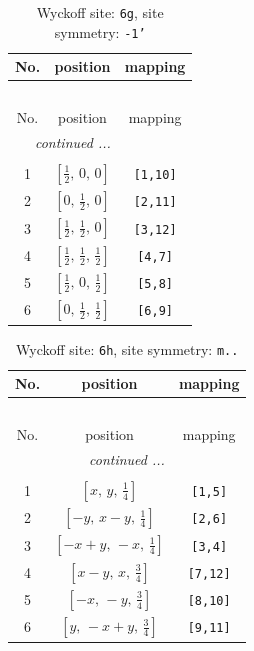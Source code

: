 \documentclass[fleqn,8pt]{jsarticle}
\begin{document}
\renewcommand{\arraystretch}{1.2}
\begin{longtable}{ccc}
\caption{Wyckoff site: {\tt 6g}, site symmetry: {\tt -1'}}
 \\
 \hline \hline
No. & position & mapping \\ \hline \endfirsthead

\multicolumn{2}{l}{\tablename\ \thetable{}} \\
 \hline \hline
No. & position & mapping \\ \hline \endhead

 \hline \hline
\multicolumn{2}{r}{\footnotesize\it continued ...} \\ \endfoot

 \hline \hline
\multicolumn{2}{r}{} \\ \endlastfoot

1 & $\left[ \frac{1}{2},\, 0,\, 0 \right]$ & {\tt [1,10]} \\ \hline
2 & $\left[ 0,\, \frac{1}{2},\, 0 \right]$ & {\tt [2,11]} \\ \hline
3 & $\left[ \frac{1}{2},\, \frac{1}{2},\, 0 \right]$ & {\tt [3,12]} \\ \hline
4 & $\left[ \frac{1}{2},\, \frac{1}{2},\, \frac{1}{2} \right]$ & {\tt [4,7]} \\ \hline
5 & $\left[ \frac{1}{2},\, 0,\, \frac{1}{2} \right]$ & {\tt [5,8]} \\ \hline
6 & $\left[ 0,\, \frac{1}{2},\, \frac{1}{2} \right]$ & {\tt [6,9]} \\
\end{longtable}
\renewcommand{\arraystretch}{1.2}
\begin{longtable}{ccc}
\caption{Wyckoff site: {\tt 6h}, site symmetry: {\tt m..}}
 \\
 \hline \hline
No. & position & mapping \\ \hline \endfirsthead

\multicolumn{2}{l}{\tablename\ \thetable{}} \\
 \hline \hline
No. & position & mapping \\ \hline \endhead

 \hline \hline
\multicolumn{2}{r}{\footnotesize\it continued ...} \\ \endfoot

 \hline \hline
\multicolumn{2}{r}{} \\ \endlastfoot

1 & $\left[ x,\, y,\, \frac{1}{4} \right]$ & {\tt [1,5]} \\ \hline
2 & $\left[ - y,\, x - y,\, \frac{1}{4} \right]$ & {\tt [2,6]} \\ \hline
3 & $\left[ - x + y,\, - x,\, \frac{1}{4} \right]$ & {\tt [3,4]} \\ \hline
4 & $\left[ x - y,\, x,\, \frac{3}{4} \right]$ & {\tt [7,12]} \\ \hline
5 & $\left[ - x,\, - y,\, \frac{3}{4} \right]$ & {\tt [8,10]} \\ \hline
6 & $\left[ y,\, - x + y,\, \frac{3}{4} \right]$ & {\tt [9,11]} \\
\end{longtable}
\end{document}
